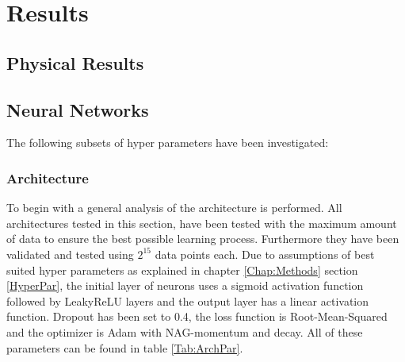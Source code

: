 \chapter{Results}
	\label{Chap:Results}
	\section{Physical Results}
	\section{Neural Networks}
		The following subsets of hyper parameters have been investigated:
		\subsection{Architecture}
			To begin with a general analysis of the architecture is performed. All architectures tested in this section, have been tested with the maximum amount of data to ensure the best possible learning process. Furthermore they have been validated and tested using $2^{15}$ data points each. Due to assumptions of best suited hyper parameters as explained in chapter \ref{Chap:Methods} section \ref{HyperPar}, the initial layer of neurons uses a sigmoid activation function followed by LeakyReLU layers and the output layer has a linear activation function. Dropout has been set to 0.4, the loss function is Root-Mean-Squared and the optimizer is Adam with NAG-momentum and decay. All of these parameters can be found in table \ref{Tab:ArchPar}.\\
			
